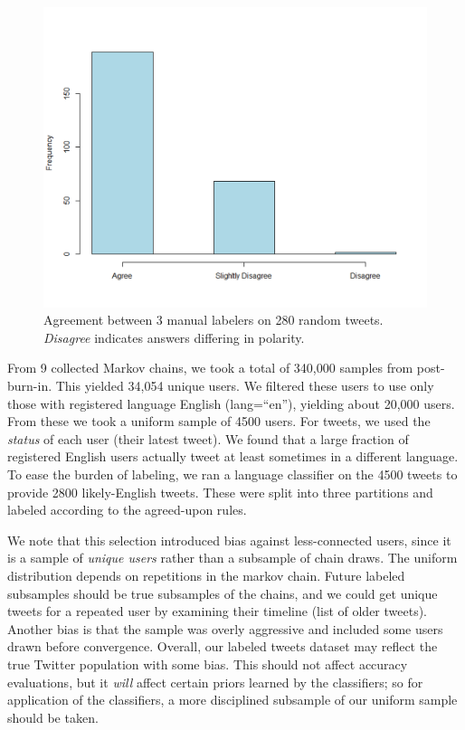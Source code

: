 \begin{figure}[htb]
\begin{center}
  \includegraphics[width=0.9\columnwidth]{figs/agreement280.png}
\begin{minipage}{0.9\columnwidth}
\end{minipage}
\end{center}
\caption{Agreement between 3 manual labelers on 280 random tweets.
    \emph{Disagree} indicates answers differing in polarity.}
\label{fig:agree}
\end{figure}


From 9 collected Markov chains, we took a total of 340,000 samples
from post-burn-in. This yielded 34,054 unique users. We filtered these
users to use only those with registered language English
(lang=``en''), yielding about 20,000 users. From these we took a
uniform sample of 4500 users. For tweets, we used the \emph{status} of
each user (their latest tweet). We found that a large fraction of
registered English users actually tweet at least sometimes in a
different language. To ease the burden of labeling, we ran a language
classifier on the 4500 tweets to provide 2800 likely-English tweets.
These were split into three partitions and labeled according to the
agreed-upon rules. 

We note that this selection introduced bias against
less-connected users, since it is a sample of \emph{unique users} rather than
a subsample of chain draws. The uniform distribution depends on repetitions in the markov chain.
Future labeled subsamples should be true subsamples of the chains, and
we could get unique tweets for a repeated user by examining their
timeline (list of older tweets). Another bias is that the sample was
overly aggressive and included some users drawn before convergence. Overall, our labeled tweets dataset may reflect
the true Twitter population with some bias. This should not affect
accuracy evaluations, but it \emph{will} affect certain priors learned by the
classifiers; so for application of the classifiers, a more disciplined
subsample of our uniform sample should be taken.

